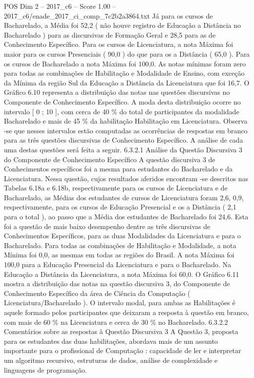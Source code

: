 \begin{textsample}{POS Dim 2 – 2017\_c6 – Score 1.00 – 2017\_c6/enade\_2017\_ci\_comp\_7c2b2a3864.txt}
Já para os cursos de Bacharelado, a Média foi 52,2 ( não houve registro de Educação a Distância no Bacharelado ) para as discursivas de Formação Geral e 28,5 para as de Conhecimento Específico.
Para os cursos de Licenciatura, a nota Máxima foi maior para os cursos Presenciais ( 90,0 ) do que para os a Distância ( 65,0 ).
Para os cursos de Bacharelado a nota Máxima foi 100,0.
As notas mínimas foram zero para todas as combinações de Habilitação e Modalidade de Ensino, com exceção da Mínima da região Sul da Educação a Distância da Licenciatura que foi 16,7.
O Gráfico 6.10 representa a distribuição das notas nas questões discursivas no Componente de Conhecimento Específico.
A moda desta distribuição ocorre no intervalo [ 0 ; 10 ], com cerca de 40 \% do total de participantes da modalidade Bacharelado e mais de 45 \% da habilitação Habilitação em Licenciatura.
Observa -se que nesses intervalos estão computadas as ocorrências de respostas em branco para as três questões discursivas de Conhecimento Específico.
A análise de cada uma destas questões será feita a seguir. 6.3.2.1 Análise da Questão Discursiva 3 do Componente de Conhecimento Específico A questão discursiva 3 de Conhecimentos específicos foi a mesma para estudantes do Bacharelado e da Licenciatura.
Nessa questão, cujos resultados aferidos encontram -se descritos nas Tabelas 6.18a e 6.18b, respectivamente para os cursos de Licenciatura e de Bacharelado, as Médias dos estudantes de cursos de Licenciatura foram 2,6, 0,9, respectivamente, para os cursos de Educação Presencial e os a Distância ( 2,1 para o total ), ao passo que a Média dos estudantes de Bacharelado foi 24,6.
Esta foi a questão de mais baixo desempenho dentre as três discursivas de Conhecimentos Específicos, para as duas Modalidades da Licenciatura e para o Bacharelado.
Para todas as combinações de Habilitação e Modalidade, a nota Mínima foi 0,0, as mesmas em todas as regiões do Brasil.
A nota Máxima foi 100,0 para a Educação Presencial da Licenciatura e para o Bacharelado.
Na Educação a Distância da Licenciatura, a nota Máxima foi 60,0.
O Gráfico 6.11 mostra a distribuição das notas na questão discursiva 3, do Componente de Conhecimento Específico da área de Ciência da Computação ( Licenciatura/Bacharelado ).
O intervalo modal, para ambas as Habilitações é aquele formado pelos participantes que deixaram a resposta à questão em branco, com mais de 60 \% na Licenciatura e cerca de 30 \% no Bacharelado. 6.3.2.2 Comentários sobre as respostas à Questão Discursiva 3 A Questão 3, proposta para os estudantes das duas habilitações, abordava mais de um assunto importante para o profissional de Computação : capacidade de ler e interpretar um algoritmo recursivo, estruturas de dados, análise de complexidade e linguagens de programação.

\end{textsample}
